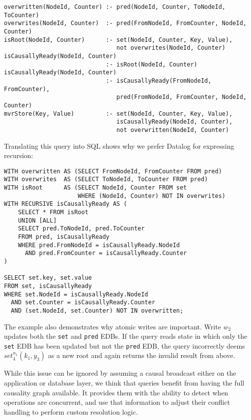 \documentclass{article}
\newcommand{\code}[1]{\texttt{#1}}
\newcommand{\setop}[5][set]{$\mathit{#1}_{#2}^{#3}(#4, #5)$}
\begin{document}
\begin{small}
    \begin{verbatim}
overwritten(NodeId, Counter) :- pred(NodeId, Counter, ToNodeId, ToCounter)
overwrites(NodeId, Counter)  :- pred(FromNodeId, FromCounter, NodeId, Counter)
isRoot(NodeId, Counter)      :- set(NodeId, Counter, Key, Value),
                                not overwrites(NodeId, Counter)
isCausallyReady(NodeId, Counter)
                             :- isRoot(NodeId, Counter)
isCausallyReady(NodeId, Counter)
                             :- isCausallyReady(FromNodeId, FromCounter),
                                pred(FromNodeId, FromCounter, NodeId, Counter)
mvrStore(Key, Value)         :- set(NodeId, Counter, Key, Value),
                                isCausallyReady(NodeId, Counter),
                                not overwritten(NodeId, Counter)
\end{verbatim}
\end{small}

Translating this query into SQL shows why we prefer Datalog
for expressing recursion:

\begin{small}
    \begin{verbatim}
WITH overwritten AS (SELECT FromNodeId, FromCounter FROM pred)
WITH overwrites  AS (SELECT ToNodeId, ToCounter FROM pred)
WITH isRoot      AS (SELECT NodeId, Counter FROM set
                     WHERE (NodeId, Counter) NOT IN overwrites)
WITH RECURSIVE isCausallyReady AS (
    SELECT * FROM isRoot
    UNION [ALL]
    SELECT pred.ToNodeId, pred.ToCounter
    FROM pred, isCausallyReady
    WHERE pred.FromNodeId = isCausallyReady.NodeId
      AND pred.FromCounter = isCausallyReady.Counter
)

SELECT set.key, set.value
FROM set, isCausallyReady
WHERE set.NodeId = isCausallyReady.NodeId
  AND set.Counter = isCausallyReady.Counter
  AND (set.NodeId, set.Counter) NOT IN overwritten;
\end{verbatim}
\end{small}

The example also demonstrates why atomic writes are important.
Write \(w_2\) updates both the \code{set} and \code{pred} EDBs.
If the query reads state in which only the \code{set} EDB has been updated
but not the \code{pred} EDB,
the query incorrectly deems \setop{4}{n_1}{k_1}{y_3} as a new root and
again returns the invalid result from above.

While this issue can be ignored by assuming a causal broadcast either on the
application or database layer,
we think that queries benefit from having the full causality graph available.
It provides them with the ability to detect when operations are concurrent,
and use that information to adjust their conflict handling
to perform custom resolution logic.
\end{document}
